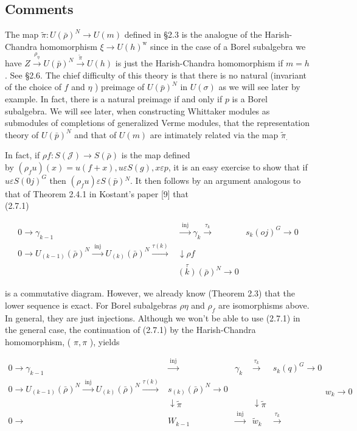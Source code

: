 \documentclass[10pt]{article}
\begin{document}
\subsection{Comments}
The map $\tilde{\pi}: U(\bar{\rho})^{N} \rightarrow U(m)$ defined in §2.3 is the analogue of the Harish-Chandra homomorphism $\xi \rightarrow U(h)^{\mathrm{w}}$ since in the case of a Borel subalgebra we have $Z \xrightarrow{\rho_{\eta}} U(\bar{p})^{N} \xrightarrow{\tilde{\pi}} U(h)$ is just the Harish-Chandra homomorphism if $m=h$. See §2.6. The chief difficulty of this theory is that there is no natural (invariant of the choice of $f$ and $\eta$ ) preimage of $U(\bar{p})^{N}$ in $U(\sigma)$ as we will see later by example. In fact, there is a natural preimage if and only if $p$ is a Borel subalgebra. We will see later, when constructing Whittaker modules as submodules of completions of generalized Verme modules, that the representation theory of $U(\bar{p})^{N}$ and that of $U(m)$ are intimately related via the map $\tilde{\pi}_{\text {. }}$

In fact, if $\rho f: S(\mathcal{J}) \rightarrow S(\bar{\rho})$ is the map defined\\
by $\left(\rho_{f} u\right)(x)=u(f+x), u \varepsilon S(g), x \varepsilon p$, it is an easy exercise to show that if $u \varepsilon S(0 j)^{G}$ then $\left(\rho_{f} u\right) \varepsilon S(\bar{p}){ }^{N}$. It then follows by an argument analogous to that of Theorem 2.4.1 in Kostant's paper [9] that\\
(2.7.1)

$$
\begin{array}{ccc}
0 \rightarrow \gamma_{k-1} & \xrightarrow{\text { inj }} \gamma_{k} \xrightarrow{\tau_{k}} & s_{k}(o j)^{G} \rightarrow 0 \\
0 \rightarrow U_{(k-1)}(\bar{\rho})^{N} \xrightarrow{\text { inj }} U_{(k)}(\bar{\rho})^{N} \xrightarrow{\tau(k)} & \downarrow \rho f \\
& \stackrel{\tau}{(k)}(\bar{\rho})^{N} \rightarrow 0
\end{array}
$$

is a commutative diagram. However, we already know (Theorem 2.3) that the lower sequence is exact. For Borel subalgebras $\rho \eta$ and $\rho_{f}$ are isomorphisms above. In general, they are just injections. Although we won't be able to use (2.7.1) in the general case, the continuation of (2.7.1) by the Harish-Chandra homomorphism, ( $\pi, \pi$ ), yields

$$
\begin{array}{lllll}
0 \rightarrow \gamma_{k-1} & \xrightarrow{\text { inj }} & \gamma_{k} & \xrightarrow{\tau_{k}} & s_{k}(q)^{G} \rightarrow 0 \\
0 \rightarrow U_{(k-1)}(\bar{\rho})^{N} \xrightarrow{\text { inj }} U_{(k)}(\bar{\rho})^{N} \xrightarrow{\tau(k)} & s_{(k)}(\bar{\rho})^{N} \rightarrow 0 \\
& \downarrow \tilde{\pi} & & \downarrow \tilde{\pi} & \\
0 \rightarrow & W_{k-1} & \xrightarrow{\text { inj }} & \tilde{w}_{k} & \xrightarrow{\tau_{k}}
\end{array} w_{k} \rightarrow 0
$$
\end{document}
